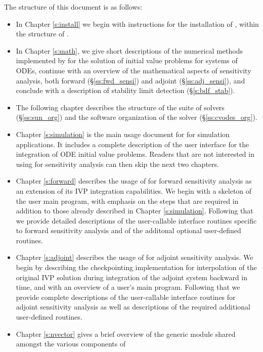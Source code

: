 The structure of this document is as follows:
\begin{itemize}
\item
  In Chapter \ref{s:install} we begin with instructions for the installation of 
  {\cvodes}, within the structure of {\sundials}.
\item
  In Chapter \ref{s:math}, we give short descriptions of the numerical 
  methods implemented by {\cvodes} for the solution of initial value problems
  for systems of ODEs, continue with an overview of the mathematical aspects 
  of sensitivity analysis, both forward (\S\ref{ss:fwd_sensi}) and adjoint
  (\S\ref{ss:adj_sensi}), and conclude with a description of stability limit
  detection (\S\ref{s:bdf_stab}).
\item
  The following chapter describes the structure of the {\sundials} suite
  of solvers (\S\ref{ss:sun_org}) and the software organization of the {\cvodes}
  solver (\S\ref{ss:cvodes_org}). 
\item
  Chapter \ref{s:simulation} is the main usage document for {\cvodes}
  for simulation applications.  It includes a complete description of
  the user interface for the integration of ODE initial value problems.
  Readers that are not interested in using {\cvodes} for sensitivity
  analysis can then skip the next two chapters.
\item
  Chapter \ref{s:forward} describes the usage of {\cvodes} for forward
  sensitivity analysis as an extension of its IVP integration
  capabilities.  We begin with a skeleton of the user main program,
  with emphasis on the steps that are required in addition to those
  already described in Chapter \ref{s:simulation}.  Following that we
  provide detailed descriptions of the user-callable interface
  routines specific to forward sensitivity analysis and of the
  additonal optional user-defined routines.
\item
  Chapter \ref{s:adjoint} describes the usage of {\cvodes} for adjoint
  sensitivity analysis. We begin by describing the {\cvodes} checkpointing 
  implementation for interpolation of the original IVP solution during
  integration of the adjoint system backward in time, and with 
  an overview of a user's main program. Following that we provide complete
  descriptions of the user-callable interface routines for adjoint sensitivity
  analysis as well as descriptions of the required additional user-defined routines.
\item
  Chapter \ref{s:nvector} gives a brief overview of the generic
  {\nvector} module shared amongst the various components of

\end{itemize}

